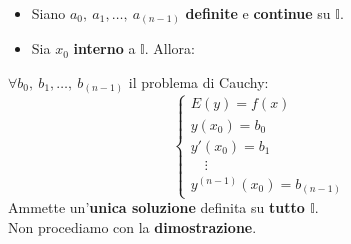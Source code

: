 \documentclass[a4paper, oneside]{article}
\newcommand\I{\mathbb{I}}
\begin{document}
        \begin{theorem}\hfil\\
            \begin{itemize}
                \item Siano $a_0, \ a_1,\dots, \ a_{(n-1)}$ \textbf{definite} e \textbf{continue} su $\I$. 
                \item Sia $x_0$ \textbf{interno} a $\I$. Allora:
            \end{itemize}
            $\forall b_0, \ b_1,\dots, \ b_{(n-1)}$ il problema di Cauchy:
            \[\begin{cases}
                E(y) = f(x) \\
                y(x_0) = b_0 \\
                y'(x_0) = b_1 \\
                \quad\vdots \\
                y^{(n-1)}(x_0) = b_{(n-1)}
            \end{cases}\]
            Ammette un'\textbf{unica soluzione} definita su \textbf{tutto $\I$}. \\
            Non procediamo con la \textbf{dimostrazione}.
        \end{theorem}
\end{document}

